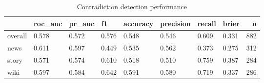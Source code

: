 \begin{table}
\caption{Contradiction detection performance}
\label{tab:results}
\begin{tabular}{llllllllr}
\toprule
 & roc_auc & pr_auc & f1 & accuracy & precision & recall & brier & n \\
\midrule
overall & 0.578 & 0.572 & 0.576 & 0.548 & 0.546 & 0.609 & 0.331 & 882 \\
news & 0.611 & 0.597 & 0.449 & 0.535 & 0.562 & 0.373 & 0.275 & 312 \\
story & 0.571 & 0.574 & 0.610 & 0.518 & 0.510 & 0.759 & 0.387 & 284 \\
wiki & 0.597 & 0.584 & 0.642 & 0.591 & 0.580 & 0.719 & 0.337 & 286 \\
\bottomrule
\end{tabular}
\end{table}
